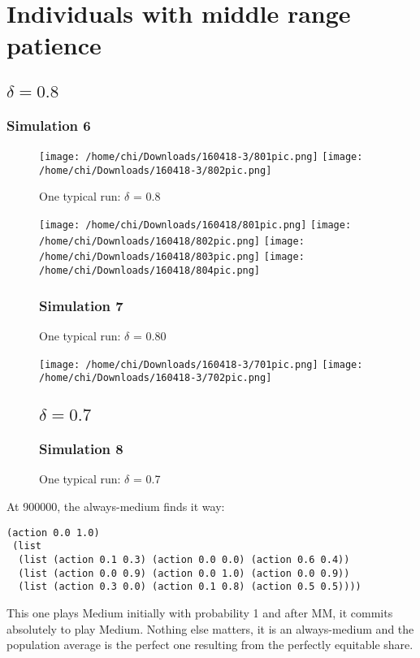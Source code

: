 \documentclass[12.5pt]{report}
\begin{document}
\section{Individuals with middle range patience}
\subsection{$\delta = 0.8$}
\subsubsection{Simulation 6}


\begin{figure}
\texttt{[image: /home/chi/Downloads/160418-3/801pic.png]}
\texttt{[image: /home/chi/Downloads/160418-3/802pic.png]}

\caption{One typical run: $\delta$ = 0.8}
\end{figure}

\begin{figure}
\texttt{[image: /home/chi/Downloads/160418/801pic.png]}
\texttt{[image: /home/chi/Downloads/160418/802pic.png]}
\texttt{[image: /home/chi/Downloads/160418/803pic.png]}
\texttt{[image: /home/chi/Downloads/160418/804pic.png]}

\subsubsection{Simulation 7}

\caption{One typical run: $\delta$ = 0.80}
\end{figure}
\begin{figure}
\texttt{[image: /home/chi/Downloads/160418-3/701pic.png]}
\texttt{[image: /home/chi/Downloads/160418-3/702pic.png]}

\subsection{$\delta = 0.7$}
\subsubsection{Simulation 8}


\caption{One typical run: $\delta$ = 0.7}
\end{figure}

At 900000, the always-medium finds it way:
\begin{verbatim}
(action 0.0 1.0)
 (list
  (list (action 0.1 0.3) (action 0.0 0.0) (action 0.6 0.4))
  (list (action 0.0 0.9) (action 0.0 1.0) (action 0.0 0.9))
  (list (action 0.3 0.0) (action 0.1 0.8) (action 0.5 0.5))))
\end{verbatim}
This one plays Medium initially with probability 1 and after MM, it commits absolutely to play Medium. Nothing else matters, it is an always-medium and the population average is the perfect one resulting from the perfectly equitable share.
\end{document}
